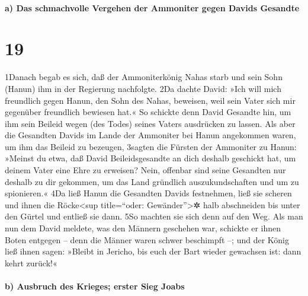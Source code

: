 \hypertarget{a-das-schmachvolle-vergehen-der-ammoniter-gegen-davids-gesandte}{%
\paragraph{a) Das schmachvolle Vergehen der Ammoniter gegen Davids
Gesandte}\label{a-das-schmachvolle-vergehen-der-ammoniter-gegen-davids-gesandte}}

\hypertarget{section-18}{%
\section{19}\label{section-18}}

1Danach begab es sich, daß der Ammoniterkönig Nahas starb und sein Sohn
(Hanun) ihm in der Regierung nachfolgte. 2Da dachte David: »Ich will
mich freundlich gegen Hanun, den Sohn des Nahas, beweisen, weil sein
Vater sich mir gegenüber freundlich bewiesen hat.« So schickte denn
David Gesandte hin, um ihm sein Beileid wegen (des Todes) seines Vaters
ausdrücken zu lassen. Als aber die Gesandten Davids im Lande der
Ammoniter bei Hanun angekommen waren, um ihm das Beileid zu bezeugen,
3sagten die Fürsten der Ammoniter zu Hanun: »Meinst du etwa, daß David
Beileidsgesandte an dich deshalb geschickt hat, um deinem Vater eine
Ehre zu erweisen? Nein, offenbar sind seine Gesandten nur deshalb zu dir
gekommen, um das Land gründlich auszukundschaften und um zu spionieren.«
4Da ließ Hanun die Gesandten Davids festnehmen, ließ sie scheren und
ihnen die Röcke\textless sup title=``oder: Gewänder''\textgreater✲ halb
abschneiden bis unter den Gürtel und entließ sie dann. 5So machten sie
sich denn auf den Weg. Als man nun dem David meldete, was den Männern
geschehen war, schickte er ihnen Boten entgegen -- denn die Männer waren
schwer beschimpft --; und der König ließ ihnen sagen: »Bleibt in
Jericho, bis euch der Bart wieder gewachsen ist: dann kehrt zurück!«

\hypertarget{b-ausbruch-des-krieges-erster-sieg-joabs}{%
\paragraph{b) Ausbruch des Krieges; erster Sieg
Joabs}\label{b-ausbruch-des-krieges-erster-sieg-joabs}}

